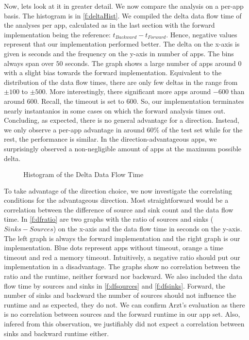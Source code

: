 \documentclass[../draft.tex]{subfiles}
\begin{document}
    Now, lets look at it in greater detail. We now compare the analysis on a per-app basis. 
    The histogram is in \autoref{f:deltaHist}. 
    We compiled the delta data flow time of the analyses per app, calculated as in the last section with the forward implementation being the reference: $t_{\mathit{Backward}} - t_{\mathit{Forward}}$. 
    Hence, negative values represent that our implementation performed better. 
    The delta on the x-axis is given is seconds and the frequency on the y-axis in number of apps. 
    The bins always span over $50$ seconds.
    The graph shows a large number of apps around $0$ with a slight bias towards the forward implementation. 
    Equivalent to the distribution of the data flow times, there are only few deltas in the range from $\pm100$ to $\pm500$. 
    More interestingly, there significant more apps around $-600$ than around $600$. 
    Recall, the timeout is set to $600$.
    So, our implementation terminates nearly instantanios in some cases on which the forward analysis times out.
    Concluding, as expected, there is no general advantage for a direction. 
    Instead, we only observe a per-app advantage in around $60\%$ of the test set while for the rest, the performance is similar.
    In the direction-advantageous apps, we surprisingly observed a non-negligible amount of apps at the maximum possible delta.  

    \begin{figure}[ht]
        \centering
        \resizebox{0.75\columnwidth}{!}{
            
        }
        \caption{Histogram of the Delta Data Flow Time}
        \label{f:deltaHist}
    \end{figure}

    To take advantage of the direction choice, we now investigate the correlating conditions for the advantageous direction. 
    Most straightforward would be a correlation between the difference of source and sink count and the data flow time. 
    In \autoref{f:dfratio} are two graphs with the ratio of sources and sinks ($\mathit{Sinks} - \mathit{Sources}$) on the x-axis and the data flow time in seconds on the y-axis.
    The left graph is always the forward implementation and the right graph is our implementation. 
    Blue dots represent apps without timeout, orange a time timeout and red a memory timeout. 
    Intuitively, a negative ratio should put our implementation in a disadvantage. The graphs show no correlation between the ratio and the runtime, neither forward nor backward. 
    We also included the data flow time by sources and sinks in \autoref{f:dfsources} and \autoref{f:dfsinks}. 
    Forward, the number of sinks and backward the number of sources should not influence the runtime and as expected, they do not. 
    We can confirm Arzt's evaluation\cite{Arzt2017PhD} as there is no correlation between sources and the forward runtime in our app set. 
    Also, infered from this observation, we justifiably did not expect a correlation between sinks and backward runtime either. 
\end{document}
